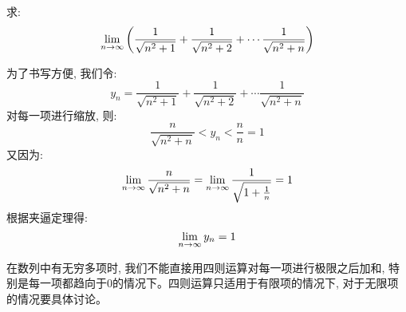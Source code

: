 \begin{example}
    求:
    \begin{equation*}
        \lim_{n \to \infty } \left( \frac{1}{\sqrt{n^2+1}} + \frac{1}{\sqrt{n^2 + 2}} + \cdots \frac{1}{\sqrt{n^2+n}} \right)
    \end{equation*}

\end{example}
\begin{solution}
    为了书写方便, 我们令:
    \begin{equation*}
        y_n = \frac{1}{\sqrt{n^2+1}} + \frac{1}{\sqrt{n^2 + 2}} + \cdots \frac{1}{\sqrt{n^2+n}}
    \end{equation*}
    对每一项进行缩放, 则:
    \begin{equation*}
        \frac{n}{\sqrt{n^2+n}} < y_n < \frac{n}{n} = 1
    \end{equation*}
    又因为:
    \begin{equation*}
        \lim_{n \to \infty } \frac{n}{\sqrt{n^2+n}} = \lim_{n \to \infty } \frac{1}{\sqrt{1+\frac{1}{n}}} = 1
    \end{equation*}
    根据夹逼定理得:
    \begin{equation*}
        \lim_{n \to \infty } y_n = 1
    \end{equation*}
\end{solution}
\begin{remark}
    在数列中有无穷多项时, 我们不能直接用四则运算对每一项进行极限之后加和, 特别是每一项都趋向于0的情况下。四则运算只适用于有限项的情况下, 对于无限项的情况要具体讨论。
\end{remark}

